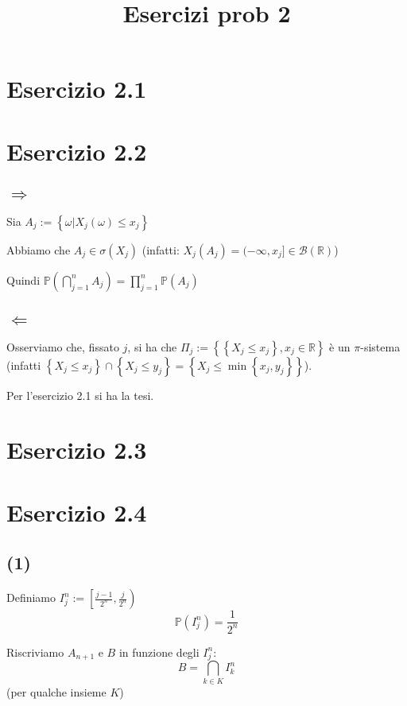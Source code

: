 \documentclass{article}
\title{Esercizi prob 2}
\begin{document}
\maketitle
\section{Esercizio 2.1}


\section{Esercizio 2.2}
\subsection{$\Rightarrow $}
Sia $A_j := \left\{\omega | X_j(\omega) \leq  x_j \right\}$

Abbiamo che $A_j \in \sigma(X_j)$ (infatti: $X_j(A_j) = (-\infty , x_j] \in \mathcal{B}(\mathbb{R})$)

Quindi $\mathbb{P}\left(\bigcap_{j=1}^{n} A_j\right) = \prod_{j=1}^{n} \mathbb{P}(A_j)$

\subsection{$\Leftarrow $}
Osserviamo che, fissato $j$, si ha che $\Pi_j := \left\{\left\{X_j \leq  x_j\right\}, x_j \in \mathbb{R}\right\}$ è un $\pi$-sistema (infatti $\left\{X_j \leq  x_j\right\} \cap \left\{X_j \leq  y_j\right\} = \left\{X_j \leq  \min\left\{x_j, y_j\right\}\right\}$).

Per l'esercizio 2.1 si ha la tesi.

\section{Esercizio 2.3}

\section{Esercizio 2.4}
\subsection{(1)}
Definiamo $I_j^n := \left[\frac{j-1}{2^n}, \frac{j}{2^n}\right)$
\[\mathbb{P}\left(I_j^n\right) = \frac{1}{2^n}\]

Riscriviamo $A_{n+1}$ e $B$ in funzione degli $I_j^n$:
\[
	B = \bigcap_{k\in K} I_k^n
\]
(per qualche insieme $K$)
\end{document}
